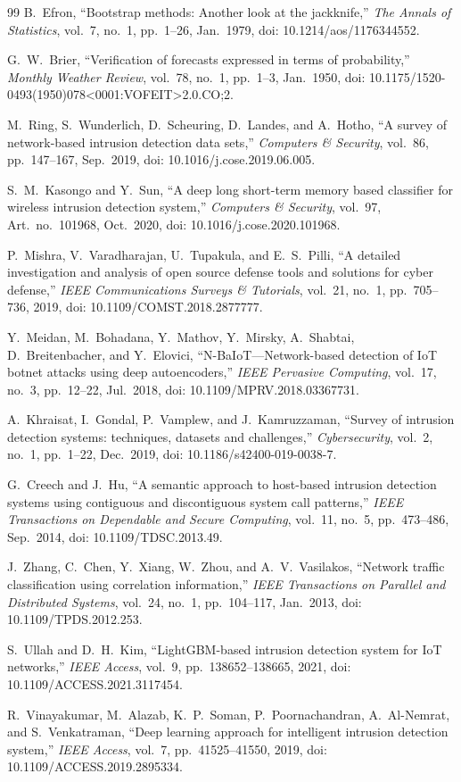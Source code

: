 \documentclass[10pt,journal,twocolumn]{IEEEtran}
\begin{document}
\begin{thebibliography}{99}
B.~Efron, ``Bootstrap methods: Another look at the jackknife,'' \emph{The Annals of Statistics}, vol.~7, no.~1, pp.~1--26, Jan.~1979, doi: 10.1214/aos/1176344552.

G.~W.~Brier, ``Verification of forecasts expressed in terms of probability,'' \emph{Monthly Weather Review}, vol.~78, no.~1, pp.~1--3, Jan.~1950, doi: 10.1175/1520-0493(1950)078<0001:VOFEIT>2.0.CO;2.

M.~Ring, S.~Wunderlich, D.~Scheuring, D.~Landes, and A.~Hotho, ``A survey of network-based intrusion detection data sets,'' \emph{Computers \& Security}, vol.~86, pp.~147--167, Sep.~2019, doi: 10.1016/j.cose.2019.06.005.

S.~M.~Kasongo and Y.~Sun, ``A deep long short-term memory based classifier for wireless intrusion detection system,'' \emph{Computers \& Security}, vol.~97, Art.~no.~101968, Oct.~2020, doi: 10.1016/j.cose.2020.101968.

P.~Mishra, V.~Varadharajan, U.~Tupakula, and E.~S.~Pilli, ``A detailed investigation and analysis of open source defense tools and solutions for cyber defense,'' \emph{IEEE Communications Surveys \& Tutorials}, vol.~21, no.~1, pp.~705--736, 2019, doi: 10.1109/COMST.2018.2877777.

Y.~Meidan, M.~Bohadana, Y.~Mathov, Y.~Mirsky, A.~Shabtai, D.~Breitenbacher, and Y.~Elovici, ``N-BaIoT---Network-based detection of IoT botnet attacks using deep autoencoders,'' \emph{IEEE Pervasive Computing}, vol.~17, no.~3, pp.~12--22, Jul.~2018, doi: 10.1109/MPRV.2018.03367731.

A.~Khraisat, I.~Gondal, P.~Vamplew, and J.~Kamruzzaman, ``Survey of intrusion detection systems: techniques, datasets and challenges,'' \emph{Cybersecurity}, vol.~2, no.~1, pp.~1--22, Dec.~2019, doi: 10.1186/s42400-019-0038-7.

G.~Creech and J.~Hu, ``A semantic approach to host-based intrusion detection systems using contiguous and discontiguous system call patterns,'' \emph{IEEE Transactions on Dependable and Secure Computing}, vol.~11, no.~5, pp.~473--486, Sep.~2014, doi: 10.1109/TDSC.2013.49.

J.~Zhang, C.~Chen, Y.~Xiang, W.~Zhou, and A.~V.~Vasilakos, ``Network traffic classification using correlation information,'' \emph{IEEE Transactions on Parallel and Distributed Systems}, vol.~24, no.~1, pp.~104--117, Jan.~2013, doi: 10.1109/TPDS.2012.253.

S.~Ullah and D.~H.~Kim, ``LightGBM-based intrusion detection system for IoT networks,'' \emph{IEEE Access}, vol.~9, pp.~138652--138665, 2021, doi: 10.1109/ACCESS.2021.3117454.

R.~Vinayakumar, M.~Alazab, K.~P.~Soman, P.~Poornachandran, A.~Al-Nemrat, and S.~Venkatraman, ``Deep learning approach for intelligent intrusion detection system,'' \emph{IEEE Access}, vol.~7, pp.~41525--41550, 2019, doi: 10.1109/ACCESS.2019.2895334.

\end{thebibliography}
\end{document}
